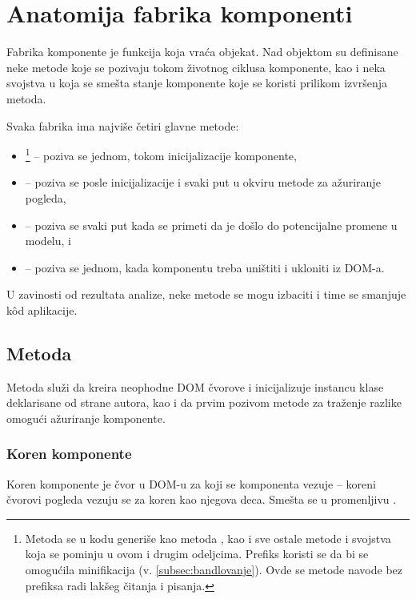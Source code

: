 \section{Anatomija fabrika komponenti}\label{sec:anatomija-fabrika-komponenti}

Fabrika komponente je funkcija koja vraća objekat.
Nad objektom su definisane neke metode koje se pozivaju tokom životnog ciklusa komponente, kao i neka svojstva u koja se smešta stanje komponente koje se koristi prilikom izvršenja metoda.

Svaka fabrika ima najviše četiri glavne metode:

\begin{itemize}
\item {}\footnote{Metoda  se u kodu generiše kao metoda , kao i sve ostale metode i svojstva koja se pominju u ovom i drugim odeljcima. Prefiks  koristi se da bi se omogućila minifikacija (v. \cref{subsec:bandlovanje}). Ovde se metode navode bez prefiksa radi lakšeg čitanja i pisanja.} -- poziva se jednom, tokom inicijalizacije komponente,
\item {} -- poziva se posle inicijalizacije i svaki put u okviru metode za ažuriranje pogleda,
\item {} -- poziva se svaki put kada se primeti da je došlo do potencijalne promene u modelu, i
\item {} -- poziva se jednom, kada komponentu treba uništiti i ukloniti iz DOM-a.
\end{itemize}

U zavinosti od rezultata analize, neke metode se mogu izbaciti i time se smanjuje kôd aplikacije.

\subsection{Metoda }

Metoda  služi da kreira neophodne DOM čvorove i inicijalizuje instancu klase deklarisane od strane autora, kao i da prvim pozivom metode za traženje razlike  omogući ažuriranje komponente.

\subsubsection{Koren komponente}
\label{subsubsec:koren-komponente}
\label{subsubsec:init-part-1}

Koren komponente je čvor u DOM-u za koji se komponenta vezuje -- koreni čvorovi pogleda vezuju se za koren kao njegova deca.
Smešta se u promenljivu .

